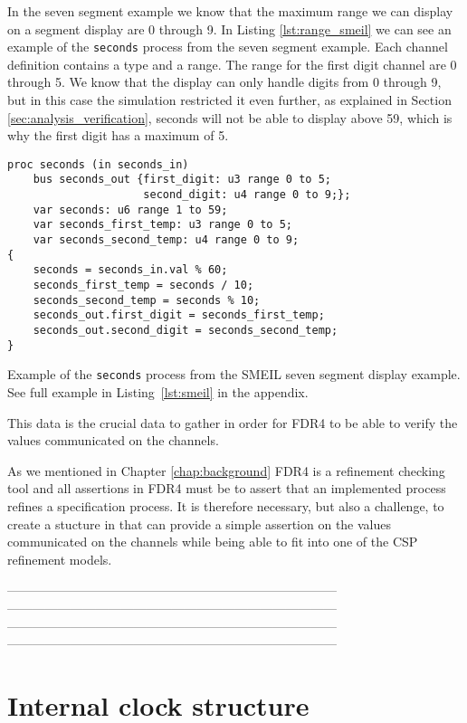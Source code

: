 In the seven segment example we know that the maximum range we can display on a segment display are 0 through 9. In Listing \ref{lst:range_smeil} we can see an example of the \texttt{seconds} process from the seven segment example.
Each channel definition contains a type and a range. The range for the first digit channel are 0 through 5. We know that the display can only handle digits from 0 through 9, but in this case the simulation restricted it even further, as explained in Section \ref{sec:analysis_verification}, seconds will not be able to display above 59, which is why the first digit has a maximum of 5.
\begin{listing}
\begin{verbatim}
proc seconds (in seconds_in)
    bus seconds_out {first_digit: u3 range 0 to 5;
                     second_digit: u4 range 0 to 9;};
    var seconds: u6 range 1 to 59;
    var seconds_first_temp: u3 range 0 to 5;
    var seconds_second_temp: u4 range 0 to 9;
{
    seconds = seconds_in.val % 60;
    seconds_first_temp = seconds / 10;
    seconds_second_temp = seconds % 10;
    seconds_out.first_digit = seconds_first_temp;
    seconds_out.second_digit = seconds_second_temp;
}
\end{verbatim}
\caption{Example of the \texttt{seconds} process from the SMEIL seven segment display example. See full example in Listing~\ref{lst:smeil} in the appendix.}
\label{lst:range_smeil}
\end{listing}

This data is the crucial data to gather in order for FDR4 to be able to verify the values communicated on the channels.

As we mentioned in Chapter \ref{chap:background} FDR4 is a refinement checking tool and all assertions in FDR4 must be to assert that an implemented process refines a specification process.
It is therefore necessary, but also a challenge, to create a stucture in \cspm{} that can provide a simple assertion on the values communicated on the channels while being able to fit into one of the CSP refinement models.


------------------------------------------------------------------------------\\
------------------------------------------------------------------------------\\
------------------------------------------------------------------------------\\
------------------------------------------------------------------------------\\



\section{Internal clock structure} \label{sec:analysis_clock}
